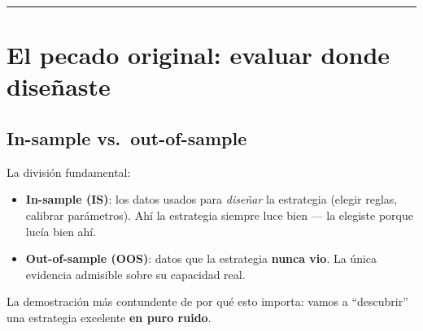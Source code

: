 \documentclass[
  spanish,
  letterpaper,
  DIV=11,
  numbers=noendperiod]{scrreprt}
\providecommand{\tightlist}{%
  \setlength{\itemsep}{0pt}\setlength{\parskip}{0pt}}
\begin{document}
\begin{center}\rule{0.5\linewidth}{0.5pt}\end{center}

\chapter{El pecado original: evaluar donde
diseñaste}\label{el-pecado-original-evaluar-donde-diseuxf1aste}

\section{In-sample vs.~out-of-sample}\label{in-sample-vs.-out-of-sample}

La división fundamental:

\begin{itemize}
\tightlist
\item
  \textbf{In-sample (IS)}: los datos usados para \emph{diseñar} la
  estrategia (elegir reglas, calibrar parámetros). Ahí la estrategia
  siempre luce bien --- la elegiste porque lucía bien ahí.
\item
  \textbf{Out-of-sample (OOS)}: datos que la estrategia \textbf{nunca
  vio}. La única evidencia admisible sobre su capacidad real.
\end{itemize}

La demostración más contundente de por qué esto importa: vamos a
``descubrir'' una estrategia excelente \textbf{en puro ruido}.
\end{document}
